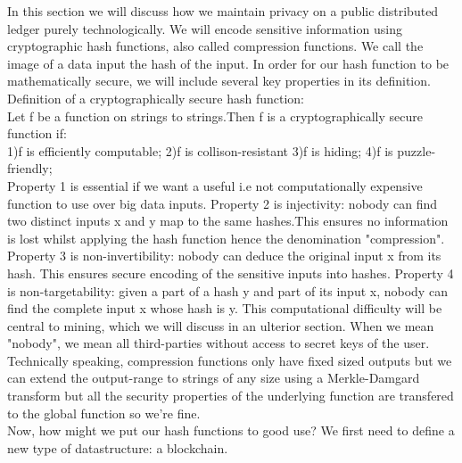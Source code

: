 In this section we will discuss how we maintain privacy on a public distributed ledger purely technologically.
We will encode sensitive information using cryptographic hash functions, also called compression functions. We call the image of a data input the hash of the input.
In order for our hash function to be mathematically secure, we will include several key properties in its definition.\\

Definition of a cryptographically secure hash function:\\
Let f be a function on strings to strings.Then f is a cryptographically secure function if:\\
  1)f is efficiently computable;
  2)f is collison-resistant
  3)f is hiding;
  4)f is puzzle-friendly;\\
  
Property 1 is essential if we want a useful i.e not computationally expensive function to use over big data inputs. Property 2 is injectivity: nobody can find two distinct inputs x and y map to the same hashes.This ensures no information is lost whilst applying the hash function hence the denomination "compression".
Property 3 is non-invertibility: nobody can deduce the original input x from its hash. This ensures secure encoding of the sensitive inputs into hashes.
Property 4 is non-targetability: given a part of a hash y and part of its input x, nobody can find the complete input x whose hash is y. This computational difficulty will be central to mining, which we will discuss in an ulterior section.
When we mean "nobody", we mean all third-parties without access to secret keys of the user.\\

Technically speaking, compression functions only have fixed sized outputs but we can extend the output-range to strings of any size using a Merkle-Damgard transform but all the security properties of the underlying function are transfered to the global function so we're fine.\\

Now, how might we put our hash functions to good use? We first need to define a new type of datastructure: a blockchain.

